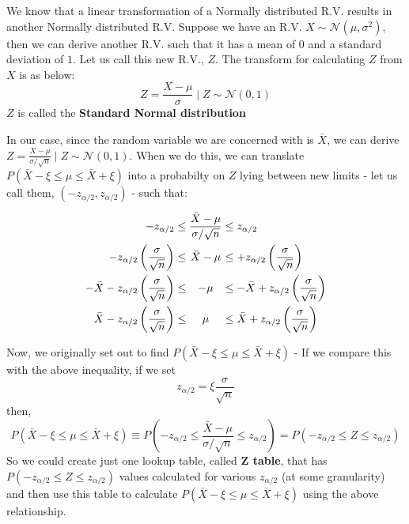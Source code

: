 We know that a linear transformation of a Normally distributed R.V. results in another Normally distributed R.V. Suppose we have an R.V. \(X \sim \mathcal{N}(\mu,\sigma^2)\), then we can derive another R.V.  such that it has a mean of \(0\) and a standard deviation of \(1\). Let us call this new R.V., \(Z\). The transform for calculating \(Z\) from \(X\) is as below:
	\[ Z = \frac{X-\mu}{\sigma} \mid Z \sim \mathcal{N}(0,1) \]
\(Z\) is called the \textbf{Standard Normal distribution}

In our case, since the random variable we are concerned with is \(\bar{X}\), we can derive \( Z = \frac{X-\mu}{\sigma/\sqrt{n}} \mid Z \sim \mathcal{N}(0,1) \). When we do this, we can translate \( P(\bar{X}-\xi \leq \mu \leq \bar{X}+\xi) \) into a probabilty on \(Z\) lying between new limits - let us call them, \( (-z_{\alpha/2}, z_{\alpha/2}) \) - such that:
	\[\arraycolsep=1.4pt\def\arraystretch{2.2}
	\begin{array}{rcccl} 
	-z_{\alpha/2} & \leq & \dfrac{\bar{X}-\mu}{\sigma/\sqrt{n}} & \leq & z_{\alpha/2}\\ 
	-z_{\alpha/2}\left(\dfrac{\sigma}{\sqrt{n}}\right) & \leq & \bar{X}-\mu & \leq & +z_{\alpha/2}\left(\dfrac{\sigma}{\sqrt{n}}\right)\\ 
	-\bar{X}-z_{\alpha/2}\left(\dfrac{\sigma}{\sqrt{n}}\right) & \leq & -\mu & \leq & -\bar{X}+z_{\alpha/2}\left(\dfrac{\sigma}{\sqrt{n}}\right)\\ 
	\bar{X}-z_{\alpha/2}\left(\dfrac{\sigma}{\sqrt{n}}\right) & \leq & \mu &\leq & \bar{X}+z_{\alpha/2}\left(\dfrac{\sigma}{\sqrt{n}}\right) 
	\end{array}
	\]
	
Now, we originally set out to find \( P(\bar{X}-\xi \leq \mu \leq \bar{X}+\xi) \) - If we compare this with the above inequality, if we set 
	\[ z_{\alpha/2} = \xi \dfrac{\sigma}{\sqrt{n}} \]
then, 
	\[ P(\bar{X}-\xi \leq \mu \leq \bar{X}+\xi) \equiv P(-z_{\alpha/2} \leq \dfrac{\bar{X}-\mu}{\sigma/\sqrt{n}} \leq z_{\alpha/2}) = P(-z_{\alpha/2} \leq Z \leq z_{\alpha/2}) \]
So we could create just one lookup table, called \textbf{Z table}, that has \( P(-z_{\alpha/2} \leq Z \leq z_{\alpha/2}) \) values calculated for various \( z_{\alpha/2} \) (at some granularity) and then use this table to calculate  \( P(\bar{X}-\xi \leq \mu \leq \bar{X}+\xi) \) using the above relationship. 
	
